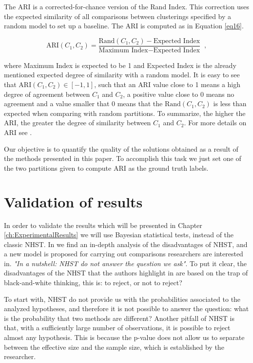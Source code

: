 The \acs{ARI} is a corrected-for-chance version of the Rand Index. This correction uses the expected similarity of all comparisons between clusterings specified by a random model to set up a baseline. The \acs{ARI} is computed as in Equation \eqref{eq16}.

\begin{equation}
\text{ARI}(C_1, C_2) = \frac{\text{Rand}(C_1, C_2) - \text{Expected Index}}{\text{Maximum Index} - \text{Expected Index}}\;\;,
\label{eq16}
\end{equation}

\noindent where Maximum Index is expected to be 1 and Expected Index is the already mentioned expected degree of similarity with a random model. It is easy to see that $\text{ARI}(C_1, C_2) \in [-1,1]$, such that an \acs{ARI} value close to 1 means a high degree of agreement between $C_1$ and $C_2$, a positive value close to 0 means no agreement and a value smaller that 0 means that the $\text{Rand}(C_1, C_2)$ is less than expected when comparing with random partitions. To summarize, the higher the \acs{ARI}, the greater the degree of similarity between $C_1$ and $C_2$. For more details on \acs{ARI} see \cite{hubert1985comparing}.

Our objective is to quantify the quality of the solutions obtained as a result of the methods presented in this paper. To accomplish this task we just set one of the two partitions given to compute \acs{ARI} as the ground truth labels.

\section{Validation of results} \label{sec:ValidtnMethod}

In order to validate the results which will be presented in Chapter \ref{ch:ExperimentalResults} we will use Bayesian statistical tests, instead of the classic \acf{NHST}. In \cite{benavoli2017time} we find an in-depth analysis of the disadvantages of \acs{NHST}, and a new model is proposed for carrying out comparisons researchers are interested in. \textit{"In a nutshell: \acs{NHST} do not answer the question we ask"}. To put it clear, the disadvantages of the \acs{NHST} that the authors highlight in \cite{benavoli2017time} are based on the trap of black-and-white thinking, this is: to reject, or not to reject?

To start with, \acs{NHST} do not provide us with the probabilities associated to the analyzed hypotheses, and therefore it is not possible to answer the question: what is the probability that two methods are different? Another pitfall of \acs{NHST} is that, with a sufficiently large number of observations, it is possible to reject almost any hypothesis. This is because the p-value does not allow us to separate between the effective size and the sample size, which is established by the researcher.

